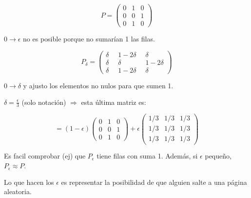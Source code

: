 \begin{example}

\begin{figure}[hbtp]
	\centering
\end{figure}

	$$P = \left( \begin{array}{ccc}
0 & 1 & 0 \\
0 & 0 & 1 \\
0 & 1 & 0 \end{array} \right)$$

$0 \rightarrow \epsilon$ no es posible porque no sumarían 1 las filas.



$$P_{\delta} = \left( \begin{array}{ccc}
\delta & \;\; 1-2\delta \;\; & \delta \\
\delta & \;\; \delta \;\;& 1 - 2 \delta\\
\delta & \;\; 1 - 2 \delta \;\; & \delta \end{array} \right)$$

$0 \rightarrow \delta$ y ajusto los elementos no nulos para que sumen 1.


$\delta = \frac{\epsilon}{3}$ (solo notación) $\Rightarrow$ esta última matriz es:


$$= (1-\epsilon)\left( \begin{array}{ccc}
0 & 1 & 0 \\
0 & 0 & 1 \\
0 & 1 & 0 \end{array} \right) + \epsilon \left( \begin{array}{ccc}
1/3 & 1/3 & 1/3 \\
1/3 & 1/3 & 1/3 \\
1/3 & 1/3 & 1/3 \end{array} \right)$$


Es facil comprobar (ej) que $P_{\epsilon}$ tiene filas con suma 1. Además, si $\epsilon$ pequeño, $P_{\epsilon} ≈ P$.

Lo que hacen los $\epsilon$ es representar la posibilidad de que alguien salte a una página aleatoria.

\begin{figure}[hbtp]
	\centering
\end{figure}

\end{example}